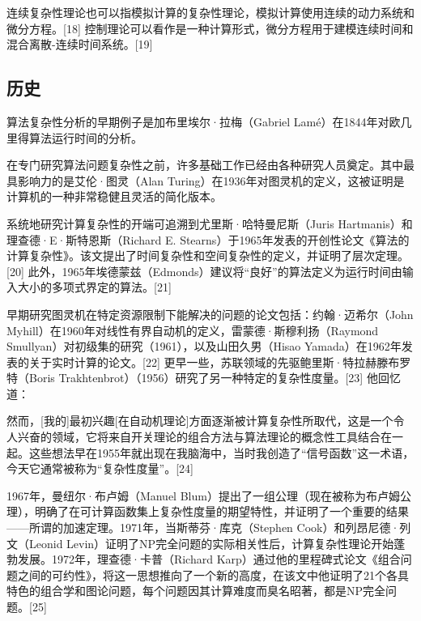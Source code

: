 连续复杂性理论也可以指模拟计算的复杂性理论，模拟计算使用连续的动力系统和微分方程。[18] 控制理论可以看作是一种计算形式，微分方程用于建模连续时间和混合离散-连续时间系统。[19]
\subsection{历史}
算法复杂性分析的早期例子是加布里埃尔·拉梅（Gabriel Lamé）在1844年对欧几里得算法运行时间的分析。

在专门研究算法问题复杂性之前，许多基础工作已经由各种研究人员奠定。其中最具影响力的是艾伦·图灵（Alan Turing）在1936年对图灵机的定义，这被证明是计算机的一种非常稳健且灵活的简化版本。

系统地研究计算复杂性的开端可追溯到尤里斯·哈特曼尼斯（Juris Hartmanis）和理查德·E·斯特恩斯（Richard E. Stearns）于1965年发表的开创性论文《算法的计算复杂性》。该文提出了时间复杂性和空间复杂性的定义，并证明了层次定理。[20] 此外，1965年埃德蒙兹（Edmonds）建议将“良好”的算法定义为运行时间由输入大小的多项式界定的算法。[21]

早期研究图灵机在特定资源限制下能解决的问题的论文包括：约翰·迈希尔（John Myhill）在1960年对线性有界自动机的定义，雷蒙德·斯穆利扬（Raymond Smullyan）对初级集的研究（1961），以及山田久男（Hisao Yamada）在1962年发表的关于实时计算的论文。[22] 更早一些，苏联领域的先驱鲍里斯·特拉赫滕布罗特（Boris Trakhtenbrot）（1956）研究了另一种特定的复杂性度量。[23] 他回忆道：

然而，[我的]最初兴趣[在自动机理论]方面逐渐被计算复杂性所取代，这是一个令人兴奋的领域，它将来自开关理论的组合方法与算法理论的概念性工具结合在一起。这些想法早在1955年就出现在我脑海中，当时我创造了“信号函数”这一术语，今天它通常被称为“复杂性度量”。[24]

1967年，曼纽尔·布卢姆（Manuel Blum）提出了一组公理（现在被称为布卢姆公理），明确了在可计算函数集上复杂性度量的期望特性，并证明了一个重要的结果——所谓的加速定理。1971年，当斯蒂芬·库克（Stephen Cook）和列昂尼德·列文（Leonid Levin）证明了NP完全问题的实际相关性后，计算复杂性理论开始蓬勃发展。1972年，理查德·卡普（Richard Karp）通过他的里程碑式论文《组合问题之间的可约性》，将这一思想推向了一个新的高度，在该文中他证明了21个各具特色的组合学和图论问题，每个问题因其计算难度而臭名昭著，都是NP完全问题。[25]


  
  
  




 